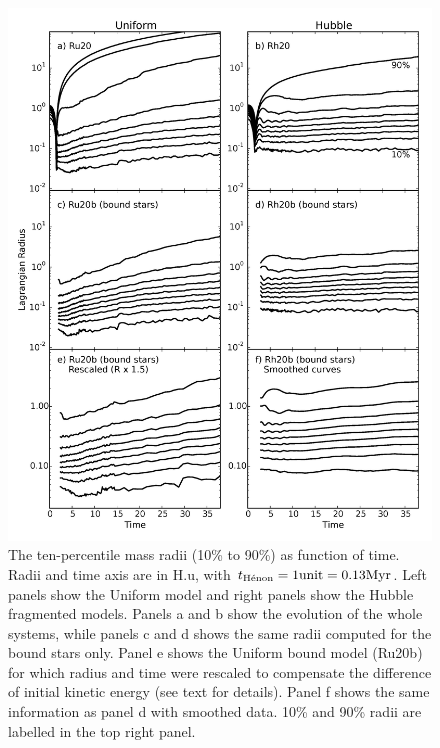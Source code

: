 

\begin{figure}
\begin{center}
\includegraphics[width=\textwidth]{Figures/3_Lagr_radius}
\caption{The ten-percentile mass radii (10\% to 90\%) as function of time. Radii and time axis are in H.u, with $t_{\textrm{H\'enon}} = 1 {\rm unit} =  0.13 {\textrm{Myr}}$. Left panels show the Uniform model and right panels show the Hubble fragmented models. Panels a and b show the evolution of the whole systems, while panels c and d shows the same radii computed for the bound stars only. Panel e shows the Uniform bound model (Ru20b) for which radius and time were rescaled to compensate the difference of initial kinetic energy (see text for details). Panel f shows the same information as panel d with smoothed data. 10\% and 90\% radii are labelled in the top right panel.
}
\label{Fig:3_Lagr_radius}
\end{center}
\end{figure}


